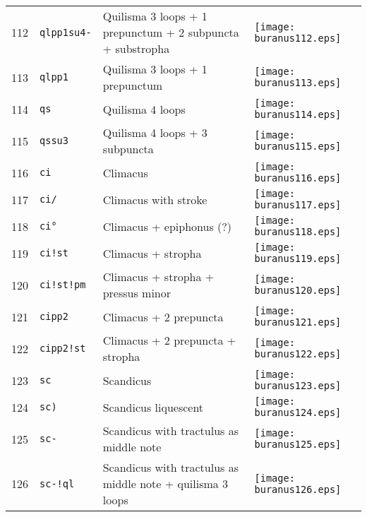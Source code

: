 \documentclass{scrarticle}
\begin{document}
\begin{longtable}{l|l|l|l}
112 & \texttt{qlpp1su4-} & Quilisma 3 loops + 1 prepunctum + 2 subpuncta + substropha & \texttt{[image: buranus112.eps]} \\
113 & \texttt{qlpp1} & Quilisma 3 loops + 1 prepunctum & \texttt{[image: buranus113.eps]} \\
114 & \texttt{qs} & Quilisma 4 loops & \texttt{[image: buranus114.eps]} \\
115 & \texttt{qssu3} & Quilisma 4 loops + 3 subpuncta & \texttt{[image: buranus115.eps]} \\
116 & \texttt{ci} & Climacus & \texttt{[image: buranus116.eps]} \\
117 & \texttt{ci/} & Climacus with stroke & \texttt{[image: buranus117.eps]} \\
118 & \texttt{ci°} & Climacus + epiphonus (?) & \texttt{[image: buranus118.eps]} \\
119 & \texttt{ci!st} & Climacus + stropha & \texttt{[image: buranus119.eps]} \\
120 & \texttt{ci!st!pm} & Climacus + stropha + pressus minor & \texttt{[image: buranus120.eps]} \\
121 & \texttt{cipp2} & Climacus + 2 prepuncta & \texttt{[image: buranus121.eps]} \\
122 & \texttt{cipp2!st} & Climacus + 2 prepuncta + stropha & \texttt{[image: buranus122.eps]} \\
123 & \texttt{sc} & Scandicus & \texttt{[image: buranus123.eps]} \\
124 & \texttt{sc)} & Scandicus liquescent & \texttt{[image: buranus124.eps]} \\
125 & \texttt{sc-} & Scandicus with tractulus as middle note & \texttt{[image: buranus125.eps]} \\
126 & \texttt{sc-!ql} & Scandicus with tractulus as middle note + quilisma 3 loops & \texttt{[image: buranus126.eps]} \\\end{longtable}
\end{document}
